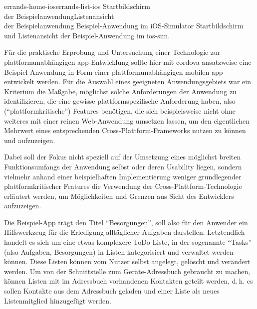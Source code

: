 
	{errands-home-ios}{errands-list-ios}
	{Startbildschirm \\ der Beispielanwendung}{Listenansicht \\der Beispielanwendung}
	{Beispiel-Anwendung im iOS-Simulator}
	{Startbildschirm und Listenansicht der Beispiel-Anwendung im \gls{ios-sim}.}
	{\ownScreenshot}

Für die praktische Erprobung und Untersuchung einer Technologie zur plattformunabhängigen \gls{app}-Entwicklung sollte hier mit \gls{cordova} ansatzweise eine Beispiel-Anwendung in Form einer plattformunabhängigen mobilen \gls{app} entwickelt werden.
Für die Auswahl eines geeigneten Anwendungsgebiets war ein Kriterium die Maßgabe, möglichst solche Anforderungen der Anwendung zu identifizieren, die eine gewisse plattformspezifische Anforderung haben, also (\enquote{plattformkritische}) Features benötigen, die sich beispielsweise nicht ohne weiteres mit einer reinen Web-Anwendung umsetzen lassen, um den eigentlichen Mehrwert eines entsprechenden Cross-Plattform-Frameworks nutzen zu können und aufzuzeigen.

Dabei soll der Fokus nicht speziell auf der Umsetzung eines möglichst breiten Funktionsumfangs der Anwendung selbst oder deren Usability liegen, sondern vielmehr anhand einer beispielhaften Implementierung weniger grundlegender plattformkritischer Features die Verwendung der Cross-Plattform-Technologie erläutert werden, um Möglichkeiten und Grenzen aus Sicht des Entwicklers aufzuzeigen.

Die Beispiel-App trägt den Titel \enquote{Besorgungen}, soll also für den Anwender ein Hilfswerkzeug für die Erledigung alltäglicher Aufgaben darstellen.
Letztendlich handelt es sich um eine etwas komplexere ToDo-Liste, in der sogenannte \enquote{Tasks} (also Aufgaben, Besorgungen) in Listen kategorisiert und verwaltet werden können.
Diese Listen können vom Nutzer selbst angelegt, gelöscht und verändert werden.
Um von der Schnittstelle zum Geräte-Adressbuch gebraucht zu machen, können Listen mit im Adressbuch vorhandenen Kontakten geteilt werden, d.\,h. es sollen Kontakte aus dem Adressbuch geladen und einer Liste als neues Listenmitglied hinzugefügt werden.

